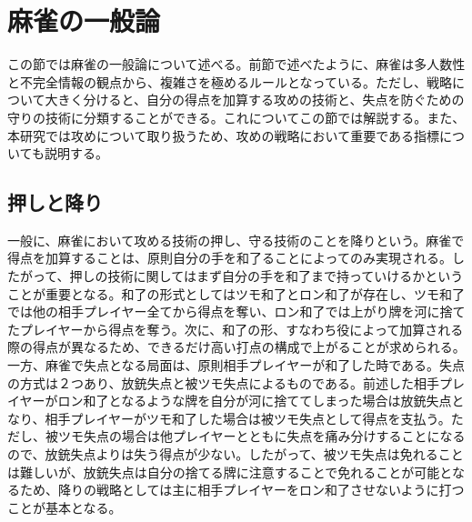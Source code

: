 
\section{麻雀の一般論}
この節では麻雀の一般論について述べる。前節で述べたように、麻雀は多人数性と不完全情報の観点から、複雑さを極めるルールとなっている。ただし、戦略について大きく分けると、自分の得点を加算する攻めの技術と、失点を防ぐための守りの技術に分類することができる。これについてこの節では解説する。また、本研究では攻めについて取り扱うため、攻めの戦略において重要である指標についても説明する。
\subsection{押しと降り}
一般に、麻雀において攻める技術の押し、守る技術のことを降りという。麻雀で得点を加算することは、原則自分の手を和了ることによってのみ実現される。したがって、押しの技術に関してはまず自分の手を和了まで持っていけるかということが重要となる。和了の形式としてはツモ和了とロン和了が存在し、ツモ和了では他の相手プレイヤー全てから得点を奪い、ロン和了では上がり牌を河に捨てたプレイヤーから得点を奪う。次に、和了の形、すなわち役によって加算される際の得点が異なるため、できるだけ高い打点の構成で上がることが求められる。
\\一方、麻雀で失点となる局面は、原則相手プレイヤーが和了した時である。失点の方式は２つあり、放銃失点と被ツモ失点によるものである。前述した相手プレイヤーがロン和了となるような牌を自分が河に捨ててしまった場合は放銃失点となり、相手プレイヤーがツモ和了した場合は被ツモ失点として得点を支払う。ただし、被ツモ失点の場合は他プレイヤーとともに失点を痛み分けすることになるので、放銃失点よりは失う得点が少ない。したがって、被ツモ失点は免れることは難しいが、放銃失点は自分の捨てる牌に注意することで免れることが可能となるため、降りの戦略としては主に相手プレイヤーをロン和了させないように打つことが基本となる。

